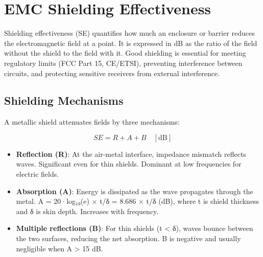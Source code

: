 \section{EMC Shielding Effectiveness}\label{sec:wiki_emc_shielding}



Shielding effectiveness (SE) quantifies how much an enclosure or barrier reduces the electromagnetic field at a point. It is expressed in dB as the ratio of the field without the shield to the field with it. Good shielding is essential for meeting regulatory limits (FCC Part 15, CE/ETSI), preventing interference between circuits, and protecting sensitive receivers from external interference.

      

\subsection{Shielding Mechanisms}

      

A metallic shield attenuates fields by three mechanisms:


      
\[SE = R + A + B \quad [\text{dB}]\]

      
\begin{itemize}

        \item \textbf{Reflection (R)}: At the air-metal interface, impedance mismatch reflects waves. Significant even for thin shields. Dominant at low frequencies for electric fields.

        \item \textbf{Absorption (A)}: Energy is dissipated as the wave propagates through the metal. A = 20·log₁₀(e) × t/δ = 8.686 × t/δ (dB), where t is shield thickness and δ is skin depth. Increases with frequency.

        \item \textbf{Multiple reflections (B)}: For thin shields (t \textless{} δ), waves bounce between the two surfaces, reducing the net absorption. B is negative and usually negligible when A \textgreater{} 15 dB.

      
\end{itemize}

      

